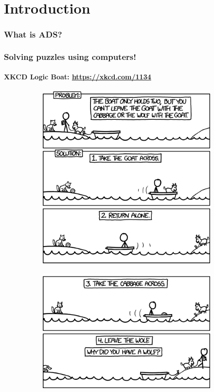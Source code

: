 \section{Introduction}

\begin{frame}
	\frametitle{What is ADS?}
	
\end{frame}

\begin{frame}
	\frametitle{Solving puzzles using computers!}
	\pause
	\framesubtitle{XKCD Logic Boat: \url{https://xkcd.com/1134}}
	
	\begin{figure}
		\begin{subfigure}{0.45\textwidth}
			\includegraphics[width=\textwidth]{figures/logic_boat_1.png}
		\end{subfigure}
		\hfill
		\pause
		\begin{subfigure}{0.45\textwidth}
			\includegraphics[width=\textwidth]{figures/logic_boat_2.png}

\end{subfigure}
\end{figure}
\end{frame}

